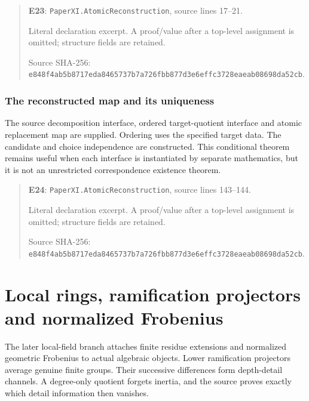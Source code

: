 \documentclass[10pt,oneside]{book}
\begin{document}
\begin{quote}\footnotesize\textbf{E23}: \nolinkurl{PaperXI.AtomicReconstruction}, source lines 17--21.\par Literal declaration excerpt. A proof/value after a top-level assignment is omitted; structure fields are retained.\par Source SHA-256: {\scriptsize\texttt{e848f4ab5b8717eda8465737b7a726fbb877d3e6effc3728eaeab08698da52cb}}.\end{quote}


\subsection{The reconstructed map and its uniqueness}
\label{guide:E24}
The source decomposition interface, ordered target-quotient interface and atomic replacement map are supplied. Ordering uses the specified target data.
The candidate and choice independence are constructed. This conditional theorem remains useful when each interface is instantiated by separate mathematics, but it is not an unrestricted correspondence existence theorem.

\begin{quote}\footnotesize\textbf{E24}: \nolinkurl{PaperXI.AtomicReconstruction}, source lines 143--144.\par Literal declaration excerpt. A proof/value after a top-level assignment is omitted; structure fields are retained.\par Source SHA-256: {\scriptsize\texttt{e848f4ab5b8717eda8465737b7a726fbb877d3e6effc3728eaeab08698da52cb}}.\end{quote}


\chapter{Local rings, ramification projectors and normalized Frobenius}
The later local-field branch attaches finite residue extensions and normalized geometric Frobenius to actual algebraic objects. Lower ramification projectors average genuine finite groups. Their successive differences form depth-detail channels. A degree-only quotient forgets inertia, and the source proves exactly which detail information then vanishes.
\end{document}
